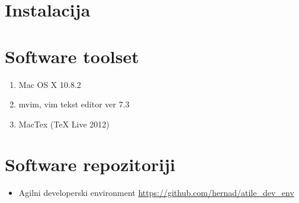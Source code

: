 \documentclass[times, utf8, seminar]{fit}
\begin{document}
\appendix

\chapter{Instalacija}
\vspace*{-0.7cm}
\setlength{\parindent}{0cm}

\chapter{Software toolset}
\begin{enumerate}
  \item Mac OS X 10.8.2
  \item mvim, vim tekst editor ver 7.3
  \item MacTex (TeX Live 2012)
\end{enumerate}

\chapter{Software repozitoriji}

\begin{itemize}
  \item Agilni developerski environment  \url{https://github.com/hernad/atile\_dev\_env}

\end{itemize}
\end{document}
